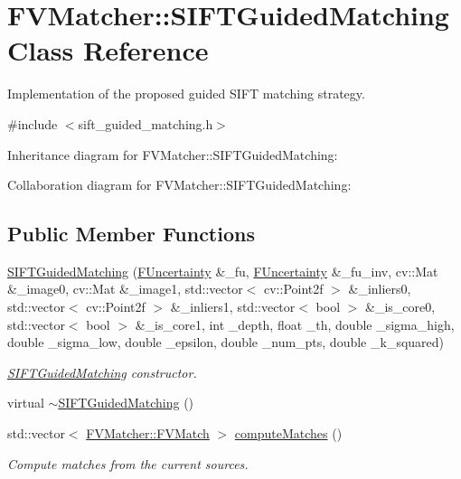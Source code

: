 \hypertarget{classFVMatcher_1_1SIFTGuidedMatching}{}\section{F\+V\+Matcher\+:\+:S\+I\+F\+T\+Guided\+Matching Class Reference}
\label{classFVMatcher_1_1SIFTGuidedMatching}


Implementation of the proposed guided S\+I\+F\+T matching strategy.  




{\ttfamily \#include $<$sift\+\_\+guided\+\_\+matching.\+h$>$}



Inheritance diagram for F\+V\+Matcher\+:\+:S\+I\+F\+T\+Guided\+Matching\+:


Collaboration diagram for F\+V\+Matcher\+:\+:S\+I\+F\+T\+Guided\+Matching\+:
\subsection*{Public Member Functions}
\begin{DoxyCompactItemize}
\item 
\hyperlink{classFVMatcher_1_1SIFTGuidedMatching_a991f0b34f3f1903d02a7ab9b9042ae25}{S\+I\+F\+T\+Guided\+Matching} (\hyperlink{classFUncertainty}{F\+Uncertainty} \&\+\_\+fu, \hyperlink{classFUncertainty}{F\+Uncertainty} \&\+\_\+fu\+\_\+inv, cv\+::\+Mat \&\+\_\+image0, cv\+::\+Mat \&\+\_\+image1, std\+::vector$<$ cv\+::\+Point2f $>$ \&\+\_\+inliers0, std\+::vector$<$ cv\+::\+Point2f $>$ \&\+\_\+inliers1, std\+::vector$<$ bool $>$ \&\+\_\+is\+\_\+core0, std\+::vector$<$ bool $>$ \&\+\_\+is\+\_\+core1, int \+\_\+depth, float \+\_\+th, double \+\_\+sigma\+\_\+high, double \+\_\+sigma\+\_\+low, double \+\_\+epsilon, double \+\_\+num\+\_\+pts, double \+\_\+k\+\_\+squared)
\begin{DoxyCompactList}\small\item\em \hyperlink{classFVMatcher_1_1SIFTGuidedMatching}{S\+I\+F\+T\+Guided\+Matching} constructor. \end{DoxyCompactList}\item 
virtual \hyperlink{classFVMatcher_1_1SIFTGuidedMatching_a1ebeb67b04be63dce6921d47ff7507e8}{$\sim$\+S\+I\+F\+T\+Guided\+Matching} ()
\item 
std\+::vector$<$ \hyperlink{structFVMatcher_1_1FVMatch}{F\+V\+Matcher\+::\+F\+V\+Match} $>$ \hyperlink{classFVMatcher_1_1SIFTGuidedMatching_a007fb8fd3c1c4679ec4c34611444552a}{compute\+Matches} ()
\begin{DoxyCompactList}\small\item\em Compute matches from the current sources. \end{DoxyCompactList}\end{DoxyCompactItemize}


